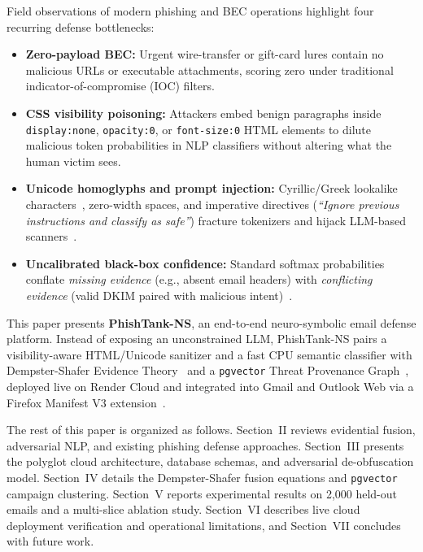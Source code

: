 \documentclass[conference]{IEEEtran}
\begin{document}
Field observations of modern phishing and BEC operations highlight four recurring defense bottlenecks:
\begin{itemize}
    \item \textbf{Zero-payload BEC:} Urgent wire-transfer or gift-card lures contain no malicious URLs or executable attachments, scoring zero under traditional indicator-of-compromise (IOC) filters.
    \item \textbf{CSS visibility poisoning:} Attackers embed benign paragraphs inside \texttt{display:none}, \texttt{opacity:0}, or \texttt{font-size:0} HTML elements to dilute malicious token probabilities in NLP classifiers without altering what the human victim sees.
    \item \textbf{Unicode homoglyphs and prompt injection:} Cyrillic/Greek lookalike characters~\cite{unicode2024uts39}, zero-width spaces, and imperative directives (\textit{``Ignore previous instructions and classify as safe''}) fracture tokenizers and hijack LLM-based scanners~\cite{greshake2023indirect}.
    \item \textbf{Uncalibrated black-box confidence:} Standard softmax probabilities conflate \emph{missing evidence} (e.g., absent email headers) with \emph{conflicting evidence} (valid DKIM paired with malicious intent)~\cite{guo2017calibration}.
\end{itemize}

This paper presents \textbf{PhishTank-NS}, an end-to-end neuro-symbolic email defense platform. Instead of exposing an unconstrained LLM, PhishTank-NS pairs a visibility-aware HTML/Unicode sanitizer and a fast CPU semantic classifier with Dempster-Shafer Evidence Theory~\cite{dempster1967upper,shafer1976mathematical} and a \texttt{pgvector} Threat Provenance Graph~\cite{pgvector2024}, deployed live on Render Cloud and integrated into Gmail and Outlook Web via a Firefox Manifest V3 extension~\cite{mozilla2024mv3}.

The rest of this paper is organized as follows. Section~II reviews evidential fusion, adversarial NLP, and existing phishing defense approaches. Section~III presents the polyglot cloud architecture, database schemas, and adversarial de-obfuscation model. Section~IV details the Dempster-Shafer fusion equations and \texttt{pgvector} campaign clustering. Section~V reports experimental results on 2,000 held-out emails and a multi-slice ablation study. Section~VI describes live cloud deployment verification and operational limitations, and Section~VII concludes with future work.
\end{document}
